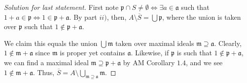 \documentclass[12pt,letterpaper]{article}
\theoremstyle{definition}
\theoremstyle{remark}
\numberwithin{figure}{problem}
\numberwithin{equation}{section}
\begin{document}
\begin{proof}[Solution for last statement]
  First note $\mathfrak{p} \cap S \ne \emptyset \iff \exists a \in \mathfrak{a}$ such that $1 + a \in \mathfrak{p} \iff 1 \in \mathfrak{p} + \mathfrak{a}$. By part $ii)$, then, $A \setminus \overline{S} = \bigcup \mathfrak{p}$, where the union is taken over $\mathfrak{p}$ such that $1 \notin \mathfrak{p} + \mathfrak{a}$.
  \par We claim this equals the union $\bigcup \mathfrak{m}$ taken over maximal ideals $\mathfrak{m} \supseteq \mathfrak{a}$. Clearly, $1 \notin \mathfrak{m} + \mathfrak{a}$ since $\mathfrak{m}$ is proper yet contains $\mathfrak{a}$. Likewise, if $\mathfrak{p}$ is such that $1 \notin \mathfrak{p} + \mathfrak{a}$, we can find a maximal ideal $\mathfrak{m} \supseteq \mathfrak{p} + \mathfrak{a}$ by AM Corollary $1.4$, and we see $1 \notin \mathfrak{m} + \mathfrak{a}$. Thus, $\overline{S} = A \setminus \bigcup_{\mathfrak{m} \supseteq \mathfrak{a}} \mathfrak{m}$.
\end{proof}
\end{document}
